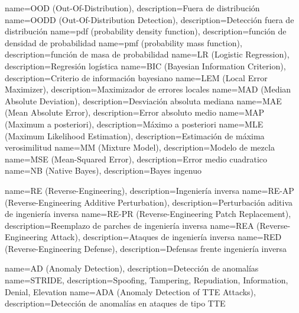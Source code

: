   {name={OOD (Out-Of-Distribution)},                  description={Fuera de distribución}}
 {name={OODD (Out-Of-Distribution Detection)},       description={Detección fuera de distribución}}
  {name={pdf (probability density function)},         description={función de densidad de probabilidad}}
  {name={pmf (probability mass function)},            description={función de masa de probabilidad}}
   {name={LR (Logistic Regression)},                   description={Regresión logística}}
  {name={BIC (Bayesian Information Criterion)},       description={Criterio de información bayesiano}}
  {name={LEM (Local Error Maximizer)},                description={Maximizador de errores locales}}
  {name={MAD (Median Absolute Deviation)},            description={Desviación absoluta mediana}}
  {name={MAE (Mean Absolute Error)},                  description={Error absoluto medio}}
  {name={MAP (Maximum a posteriori)},                 description={Máximo a posteriori}}
  {name={MLE (Maximum Likelihood Estimation)},        description={Estimación de máxima verosimilitud}}
   {name={MM (Mixture Model)},                         description={Modelo de mezcla}}
  {name={MSE (Mean-Squared Error)},                   description={Error medio cuadratico}}
   {name={NB (Native Bayes)},                          description={Bayes ingenuo}}


       {name={RE (Reverse-Engineering)},                           description={Ingeniería inversa}}
    {name={RE-AP (Reverse-Engineering Additive Perturbation)},  description={Perturbación aditiva de ingeniería inversa}}
    {name={RE-PR (Reverse-Engineering Patch Replacement)},      description={Reemplazo de parches de ingeniería inversa}}
      {name={REA (Reverse-Engineering Attack)},                   description={Ataques de ingeniería inversa}}
      {name={RED (Reverse-Engineering Defense)},                  description={Defensas frente ingeniería inversa}}


       {name={AD (Anomaly Detection)}, description={Detección de anomalías}}
   {name={STRIDE},                 description={Spoofing, Tampering, Repudiation, Information, Denial, Elevation}}
  {name={ADA (Anomaly Detection of TTE Attacks)}, description={Detección de anomalías en ataques de tipo TTE}}


